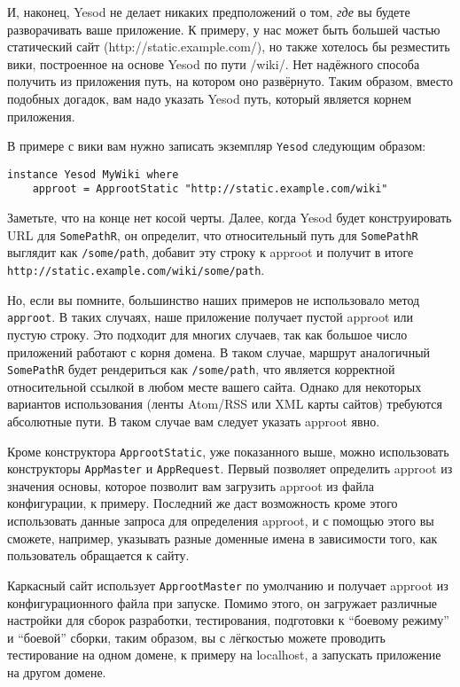 И, наконец, Yesod не делает никаких предположений о том, \emph{где} вы будете разворачивать ваше приложение. К примеру, у нас может быть большей частью статический сайт (http://static.example.com/), но также хотелось бы резместить вики, построенное на основе Yesod по пути /wiki/. Нет надёжного способа получить из приложения путь, на котором оно развёрнуто. Таким образом, вместо подобных догадок, вам надо указать Yesod путь, который является корнем приложения.

В примере с вики вам нужно записать экземпляр \lstinline!Yesod! следующим образом:

\begin{lstlisting}
instance Yesod MyWiki where
    approot = ApprootStatic "http://static.example.com/wiki"
\end{lstlisting}

Заметьте, что на конце нет косой черты. Далее, когда Yesod будет конструировать URL для \lstinline!SomePathR!, он определит, что относительный путь для \lstinline!SomePathR! выглядит как \lstinline!/some/path!, добавит эту строку к approot и получит в итоге \lstinline!http://static.example.com/wiki/some/path!.

Но, если вы помните, большинство наших примеров не использовало метод \lstinline!approot!. В таких случаях, наше приложение получает пустой approot или пустую строку. Это подходит для многих случаев, так как большое число приложений работают с корня домена. В таком случае, маршрут аналогичный \lstinline!SomePathR! будет рендериться как \lstinline!/some/path!, что является корректной относительной ссылкой в любом месте вашего сайта. Однако для некоторых вариантов использования (ленты Atom/RSS или XML карты сайтов) требуются абсолютные пути. В таком случае вам следует указать approot явно.

Кроме конструктора \lstinline!ApprootStatic!, уже показанного выше, можно использовать конструкторы \lstinline!AppMaster! и \lstinline!AppRequest!. Первый позволяет определить approot из значения основы, которое позволит вам загрузить approot из файла конфигурации, к примеру. Последний же даст возможность кроме этого использовать данные запроса для определения approot, и с помощью этого вы сможете, например, указывать разные доменные имена в зависимости того, как пользователь обращается к сайту.

Каркасный сайт использует \lstinline!ApprootMaster! по умолчанию и получает approot из конфигурационного файла при запуске. Помимо этого, он загружает различные настройки для сборок разработки, тестирования, подготовки к ``боевому режиму'' и ``боевой'' сборки, таким образом, вы с лёгкостью можете проводить тестирование на одном домене, к примеру на localhost, а запускать приложение на другом домене.

